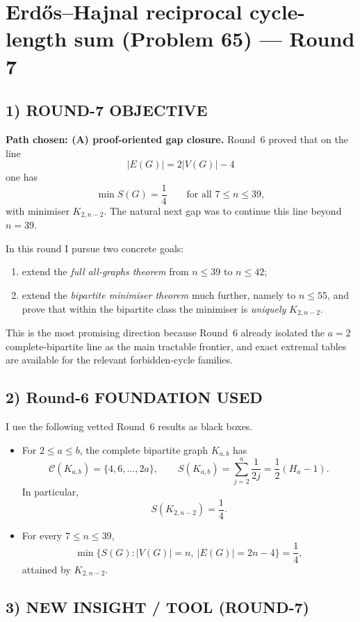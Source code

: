 \section{Erd\H{o}s--Hajnal reciprocal cycle-length sum (Problem 65) --- Round 7}

\subsection*{1) ROUND-7 OBJECTIVE}

\textbf{Path chosen: (A) proof-oriented gap closure.}
Round~6 proved that on the line
\[
|E(G)|=2|V(G)|-4
\]
one has
\[
\min S(G)=\frac14
\qquad\text{for all }7\le n\le 39,
\]
with minimiser $K_{2,n-2}$.
The natural next gap was to continue this line beyond $n=39$.

In this round I pursue two concrete goals:
\begin{enumerate}
\item extend the \emph{full all-graphs theorem} from $n\le 39$ to $n\le 42$;
\item extend the \emph{bipartite minimiser theorem} much further, namely to $n\le 55$, and prove that within the bipartite class the minimiser is \emph{uniquely} $K_{2,n-2}$.
\end{enumerate}

This is the most promising direction because Round~6 already isolated the $a=2$ complete-bipartite line as the main tractable frontier, and exact extremal tables are available for the relevant forbidden-cycle families.

\subsection*{2) Round-6 FOUNDATION USED}

I use the following vetted Round~6 results as black boxes.

\begin{itemize}
\item[(F1)] For $2\le a\le b$, the complete bipartite graph $K_{a,b}$ has
\[
\mathcal C(K_{a,b})=\{4,6,\dots,2a\},
\qquad
S(K_{a,b})=\sum_{j=2}^{a}\frac1{2j}=\frac12(H_a-1).
\]
In particular,
\[
S(K_{2,n-2})=\frac14.
\]

\item[(F2)] For every $7\le n\le 39$,
\[
\min\{S(G): |V(G)|=n,\ |E(G)|=2n-4\}=\frac14,
\]
attained by $K_{2,n-2}$.
\end{itemize}

\subsection*{3) NEW INSIGHT / TOOL (ROUND-7)}

